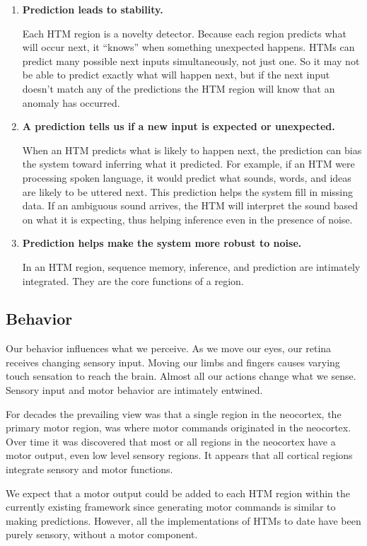 \documentclass{report}
\begin{document}
\begin{enumerate}
\item {\bf Prediction leads to stability.}

Each HTM region is a novelty detector. Because each region predicts
what will occur next, it ``knows'' when something unexpected
happens. HTMs can predict many possible next inputs simultaneously,
not just one. So it may not be able to predict exactly what will
happen next, but if the next input doesn't match any of the
predictions the HTM region will know that an anomaly has occurred.

\item {\bf A prediction tells us if a new input is expected or unexpected.}

When an HTM predicts what is likely to happen next, the prediction can
bias the system toward inferring what it predicted. For example, if an
HTM were processing spoken language, it would predict what sounds,
words, and ideas are likely to be uttered next. This prediction helps
the system fill in missing data. If an ambiguous sound arrives, the
HTM will interpret the sound based on what it is expecting, thus
helping inference even in the presence of noise.

\item {\bf Prediction helps make the system more robust to noise.}

In an HTM region, sequence memory, inference, and prediction are
intimately integrated. They are the core functions of a region.

\end{enumerate}

\subsection*{Behavior}

Our behavior influences what we perceive. As we move our eyes, our
retina receives changing sensory input. Moving our limbs and fingers
causes varying touch sensation to reach the brain. Almost all our
actions change what we sense. Sensory input and motor behavior are
intimately entwined.

For decades the prevailing view was that a single region in the
neocortex, the primary motor region, was where motor commands
originated in the neocortex. Over time it was discovered that most or
all regions in the neocortex have a motor output, even low level
sensory regions. It appears that all cortical regions integrate
sensory and motor functions.

We expect that a motor output could be added to each HTM region within
the currently existing framework since generating motor commands is
similar to making predictions. However, all the implementations of
HTMs to date have been purely sensory, without a motor component.
\end{document}
